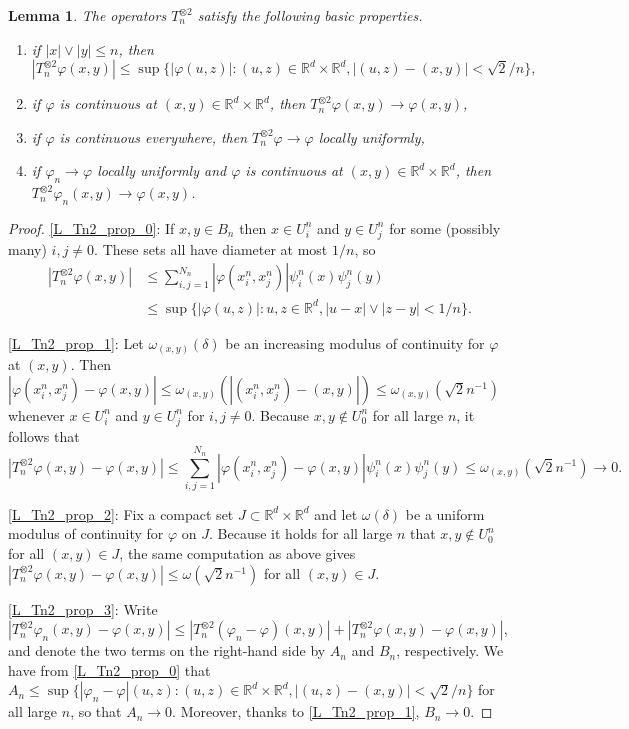 \documentclass{article}
\newtheorem{lemma}[theorem]{Lemma}
\theoremstyle{definition}
\numberwithin{equation}{section}
\numberwithin{theorem}{section}
\newcommand{\R}{\mathbb{R}}
\begin{document}
\begin{lemma}\label{L_Tn2_prop}
The operators $T_n^{\otimes 2}$ satisfy the following basic properties.
\begin{enumerate}
\item\label{L_Tn2_prop_0} if $|x|\vee|y|\le n$, then 
$$|T_n^{\otimes 2}\varphi(x,y)| \le \sup\{|\varphi(u,z)|\colon (u,z)\in\R^d\times\R^d, |(u,z)-(x,y)|<\sqrt{2}/n\},$$
\item\label{L_Tn2_prop_1} if $\varphi$ is continuous at $(x,y)\in\R^d\times\R^d$, then $T_n^{\otimes 2}\varphi(x,y)\to\varphi(x,y)$,
\item\label{L_Tn2_prop_2} if $\varphi$ is continuous everywhere, then $T_n^{\otimes 2}\varphi\to\varphi$ locally uniformly,
\item\label{L_Tn2_prop_3} if $\varphi_n\to\varphi$ locally uniformly and $\varphi$ is continuous at $(x,y)\in\R^d\times\R^d$, then $T_n^{\otimes 2}\varphi_n(x,y)\to\varphi(x,y)$.
\end{enumerate}
\end{lemma}


\begin{proof}
\ref{L_Tn2_prop_0}: If $x,y\in B_n$ then $x\in U^n_i$ and $y\in U^n_j$ for some (possibly many) $i,j\ne0$. These sets all have diameter at most $1/n$, so
\begin{align*}
|T_n^{\otimes 2}\varphi(x,y)|
&\le\sum_{i,j=1}^{N_n}|\varphi(x^n_i,x^n_j)|\psi^n_i(x)\psi^n_j(y)\\
&\le\sup\{|\varphi(u,z)|\colon u,z\in {\R^d},|u-x|\vee|z-y|<1/n\}.
\end{align*}

\ref{L_Tn2_prop_1}: Let $\omega_{(x,y)}(\delta)$ be an increasing modulus of continuity for $\varphi$ at $(x,y)$. Then $|\varphi(x^n_i,x^n_j)-\varphi(x,y)|\le\omega_{(x,y)}(|(x^n_i,x^n_j)-(x,y)|)\le\omega_{(x,y)}(\sqrt{2}n^{-1})$ whenever $x\in U^n_i$ and $y\in U^n_j$ for $i,j\ne0$. Because $x,y\notin U^n_0$ for all large $n$, it follows that
\[
|T_n^{\otimes 2}\varphi(x,y) - \varphi(x,y)| \le \sum_{i,j=1}^{N_n} |\varphi(x^n_i,x^n_j) - \varphi(x,y)|\psi^n_i(x)\psi^n_j(y) \le \omega_{(x,y)}(\sqrt{2}n^{-1}) \to 0.
\]

\ref{L_Tn2_prop_2}: Fix a compact set $J\subset\R^d\times\R^d$ and let $\omega(\delta)$ be a uniform modulus of continuity for $\varphi$ on $J$. Because it holds for all large $n$ that $x,y\not\in U^n_0$ for all $(x,y)\in J$, the same computation as above gives $|T_n^{\otimes 2}\varphi(x,y) - \varphi(x,y)| \le \omega(\sqrt{2}n^{-1})$ for all $(x,y)\in J$.

\ref{L_Tn2_prop_3}: Write $|T_n^{\otimes 2}\varphi_n(x,y)-\varphi(x,y)| \le |T_n^{\otimes 2}(\varphi_n-\varphi)(x,y)| + |T_n^{\otimes 2}\varphi(x,y)-\varphi(x,y)|$, and denote the two terms on the right-hand side by $A_n$ and $B_n$, respectively. We have from \ref{L_Tn2_prop_0} that $A_n\le
\sup\{|\varphi_n-\varphi|(u,z)\colon (u,z)\in\R^d\times\R^d, |(u,z)-(x,y)|<\sqrt{2}/n\}
$ for all large $n$, so that $A_n\to0$. Moreover, thanks to \ref{L_Tn2_prop_1}, $B_n\to0$.
\end{proof}
\end{document}
